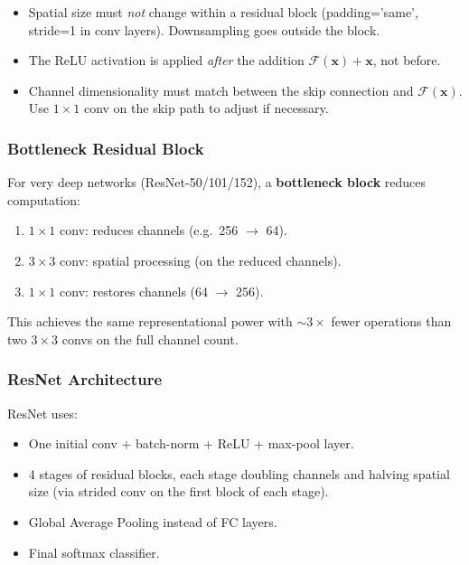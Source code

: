 \documentclass[11pt,a4paper]{article}
\newcommand{\term}[1]{\textcolor{DefGreen}{\textbf{#1}}}
\begin{document}
\begin{warnbox}
\begin{itemize}
  \item Spatial size must \emph{not} change within a residual block (padding='same', stride=1 in conv layers). Downsampling goes outside the block.
  \item The ReLU activation is applied \emph{after} the addition $\mathcal{F}(\mathbf{x}) + \mathbf{x}$, not before.
  \item Channel dimensionality must match between the skip connection and $\mathcal{F}(\mathbf{x})$. Use $1\times1$ conv on the skip path to adjust if necessary.
\end{itemize}
\end{warnbox}

\subsubsection{Bottleneck Residual Block}

For very deep networks (ResNet-50/101/152), a \term{bottleneck block} reduces computation:
\begin{enumerate}
  \item $1\times1$ conv: reduces channels (e.g.\ 256 $\to$ 64).
  \item $3\times3$ conv: spatial processing (on the reduced channels).
  \item $1\times1$ conv: restores channels (64 $\to$ 256).
\end{enumerate}
This achieves the same representational power with $\sim3\times$ fewer operations than two $3\times3$ convs on the full channel count.

\subsubsection{ResNet Architecture}

ResNet uses:
\begin{itemize}
  \item One initial conv + batch-norm + ReLU + max-pool layer.
  \item 4 stages of residual blocks, each stage doubling channels and halving spatial size (via strided conv on the first block of each stage).
  \item Global Average Pooling instead of FC layers.
  \item Final softmax classifier.
\end{itemize}
\end{document}

